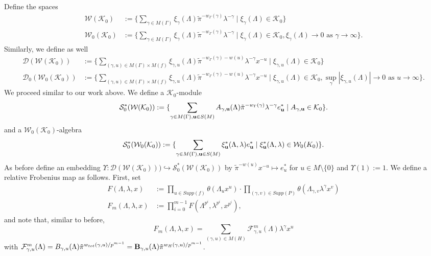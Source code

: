 \documentclass{article}
\theoremstyle{remark}
\def\c #1{ {\mathcal #1} }
\def\b #1{ {\bf #1} }
\begin{document}
Define the spaces 
\begin{align*}
\c W(\c K_0) &:= \{ \sum_{\gamma \in M(\Gamma)} \xi_\gamma(\Lambda) \tilde \pi^{-w_\Gamma(\gamma)} \lambda^{-\gamma} \mid \xi_\gamma(\Lambda) \in \c K_0 \} \\
\c W_0(\c K_0) &:= \{ \sum_{\gamma \in M(\Gamma)} \xi_\gamma(\Lambda) \tilde \pi^{-w_\Gamma(\gamma)} \lambda^{-\gamma} \mid \xi_\gamma(\Lambda) \in \c K_0, \xi_\gamma(\Lambda) \rightarrow 0 \text{ as } \gamma \rightarrow \infty \}.  
\end{align*}
Similarly, we define as well
\begin{align*}
\c D( \c W(\c K_0)) &:= \{ \sum_{(\gamma, u) \in M(\Gamma) \times M(f) } \xi_{\gamma, u}(\Lambda) \tilde \pi^{-w_\Gamma(\gamma) - w(u)} \lambda^{-\gamma} x^{-u} \mid \xi_{\gamma, u}(\Lambda) \in \c K_0 \} \\
\c D_0( \c W_0( \c K_0) ) &:= \{ \sum_{(\gamma, u) \in M(\Gamma) \times M(f) } \xi_{\gamma, u}(\Lambda) \tilde \pi^{-w_\Gamma(\gamma) - w(u)} \lambda^{-\gamma} x^{-u}  \mid \xi_{\gamma, u}(\Lambda) \in \c K_0,  \sup_{\gamma} | \xi_{\gamma, u}(\Lambda)| \rightarrow 0 \text{ as } u \rightarrow \infty \}.
\end{align*}
We proceed similar to our work above. We define a $\c K_0$-module
\[
\c S^*_0(\c W(\c K_0)) := \{ \sum_{\gamma \in M(\Gamma), \b u \in S(M)} A_{\gamma, \b u}(\Lambda) \tilde \pi^{-w_\Gamma(\gamma)} \lambda^{-\gamma} e_{\b u}^* \mid A_{\gamma, \b u} \in \c K_0 \}.
\]
and a $\c W_0(\c K_0)$-algebra
\[
\c S^*_0(\c W_0(\c K_0)) := \{ \sum_{\gamma \in M(\Gamma), \b u \in S(M)} \xi^*_{ \b u}(\Lambda, \lambda) e_{\b u}^* \mid \xi^*_{ \b u}(\Lambda, \lambda) \in \c W_0(K_0) \}.
\]
As before define an embedding $\Upsilon: \c D(\c W(\c K_0))) \hookrightarrow \c S^*_0(\c W(\c K_0))$ by $\tilde \pi^{-w(u)} x^{-u} \mapsto e_u^*$ for $u \in M \setminus \{0\}$ and $\Upsilon(1) := 1$. We define a relative Frobenius map as follows. First, set
\begin{align*}
F(\Lambda, \lambda, x) &:= \prod_{u \in Supp(f)} \theta(\Lambda_u x^u) \cdot \prod_{(\gamma, v) \in Supp(P)} \theta( \Lambda_{\gamma, v} \lambda^\gamma x^v) \\
F_m(\Lambda, \lambda, x) &:= \prod_{i=0}^{m-1} F(\Lambda^{p^i}, \lambda^{p^i}, x^{p^i}),
\end{align*}
and note that, similar to before,
\[
F_m(\Lambda, \lambda, x) = \sum_{(\gamma, u) \in M(H)} \c F^m_{\gamma, u}(\Lambda) \lambda^{\gamma} x^u 
\]
with $\c F^m_{\gamma, u}(\Lambda)= B_{\gamma,u}(\Lambda) \tilde{\pi}^{w_{tot}(\gamma,u)/p^{m-1}} = \b B_{\gamma,u}(\Lambda) \tilde{\pi}^{w_H(\gamma,u)/p^{m-1}}$.
\end{document}
